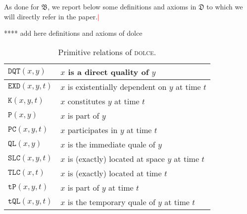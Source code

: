 \documentclass[ao]{iosart2x}
\newcommand{\nb}[1]{\textcolor{red}{$|$}\marginpar{\hspace*{-0cm}\parbox{20mm}{\scriptsize\raggedright\textcolor{red}{#1}}}}
\newcommand{\pr}[1]{\mathtt{#1}}
\newcommand{\dolce}{{\textsc{dolce}}}
\newcommand {\thdolce} {\ensuremath{\mathfrak{D}}}
\newcommand {\thbfo} {\ensuremath{\mathfrak{B}}}
\newcommand {\TPd} {\ensuremath{\pr{tP}}}
\newcommand {\Pd} {\ensuremath{\pr{P}}}
\newcommand {\DQTd} {\ensuremath{\pr{DQT}}}
\newcommand {\QLd} {\ensuremath{\pr{QL}}}
\newcommand {\TQLd} {\ensuremath{\pr{tQL}}}
\newcommand {\PCd} {\ensuremath{\pr{PC}}}
\newcommand {\Kd} {\ensuremath{\pr{K}}}
\newcommand {\EXDd} {\ensuremath{\pr{EXD}}}
\newcommand {\SLCd} {\ensuremath{\pr{SLC}}}
\newcommand {\TLCd} {\ensuremath{\pr{TLC}}}
\begin{document}
As done for $\thbfo$, we report below some definitions and axioms in $\thdolce$ to which we will directly refer in the paper.\nb{CM: forse conviene mettere qui tutti gli assiomi/def di dolce}

{\color{red} **** add here definitions and axioms of dolce}

%

\begin{table*}
\caption{Primitive relations of {\dolce}.}\label{table_prim_dolce}
\begin{tabular}{|l|l|}
\hline
$\DQTd(x,y)$ & $x$ is a direct quality of $y$ \\
\hline
$\EXDd(x,y,t)$ & $x$ is existentially dependent on $y$ at time $t$\\
\hline
$\Kd(x,y,t)$ & $x$ constitutes $y$  at time $t$ \\
\hline
$\Pd(x,y)$ & $x$ is part of $y$ \\
\hline
$\PCd(x,y,t)$ & $x$ participates in $y$ at time $t$\\
\hline
$\QLd(x,y)$ & $x$ is the immediate quale of $y$ \\
\hline
$\SLCd(x,y,t)$ & $x$ is (exactly) located at space $y$ at time $t$\\
\hline
$\TLCd(x,t)$ & $x$ is (exactly) located at time $t$ \\
\hline
$\TPd(x,y,t)$ & $x$ is part of $y$ at time $t$ \\
\hline
$\TQLd(x,y,t)$ & $x$ is the temporary quale of $y$ at time $t$\\
\hline
\end{tabular}
\end{table*}

\end{document}
